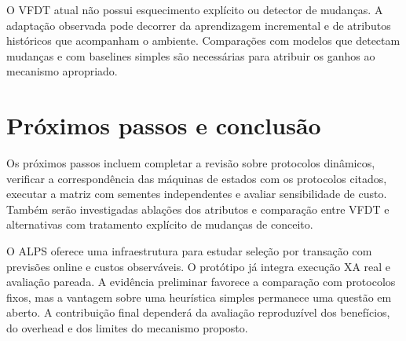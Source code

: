\documentclass[12pt,a4paper]{article}
\begin{document}
O VFDT atual não possui esquecimento explícito ou detector de mudanças. A adaptação observada pode decorrer da aprendizagem incremental e de atributos históricos que acompanham o ambiente. Comparações com modelos que detectam mudanças e com baselines simples são necessárias para atribuir os ganhos ao mecanismo apropriado.

\section{Próximos passos e conclusão}
Os próximos passos incluem completar a revisão sobre protocolos dinâmicos, verificar a correspondência das máquinas de estados com os protocolos citados, executar a matriz com sementes independentes e avaliar sensibilidade de custo. Também serão investigadas ablações dos atributos e comparação entre VFDT e alternativas com tratamento explícito de mudanças de conceito.

O ALPS oferece uma infraestrutura para estudar seleção por transação com previsões online e custos observáveis. O protótipo já integra execução XA real e avaliação pareada. A evidência preliminar favorece a comparação com protocolos fixos, mas a vantagem sobre uma heurística simples permanece uma questão em aberto. A contribuição final dependerá da avaliação reproduzível dos benefícios, do overhead e dos limites do mecanismo proposto.
\end{document}
